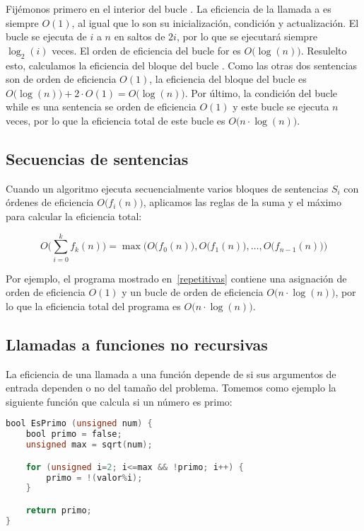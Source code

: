 Fijémonos primero en el interior del bucle .
La eficiencia de la llamada a  es siempre $O(1)$, al igual que lo son su inicialización, condición y actualización.
El bucle se ejecuta de $i$ a $n$ en saltos de $2i$, por lo que se ejecutará siempre $\log_2(i)$ veces.
El orden de eficiencia del bucle for es $O\big(\log(n)\big)$.
Resulelto esto, calculamos la eficiencia del bloque del bucle .
Como las otras dos sentencias son de orden de eficiencia $O(1)$, la eficiencia del bloque del bucle  es $O\big(\log(n)\big)+2\cdot O(1)=O\big(\log(n)\big)$.
Por último, la condición del bucle while es una sentencia se orden de eficiencia $O(1)$ y este bucle se ejecuta $n$ veces, por lo que la eficiencia total de este bucle es $O\big(n\cdot\log(n)\big)$.

\pagebreak

\subsection{Secuencias de sentencias}\label{secuenciasentencias}

Cuando un algoritmo ejecuta secuencialmente varios bloques de sentencias $S_i$ con órdenes de eficiencia $O\big(f_i(n)\big)$, aplicamos las reglas de la suma y el máximo para calcular la eficiencia total:

\[O\Big(\sum_{i=0}^{k}f_k(n)\Big) = \max\Big(O\big(f_0(n)\big),O\big(f_1(n)\big),\ldots,O\big(f_{n-1}(n)\big)\Big)\]

Por ejemplo, el programa mostrado en~\ref{repetitivas} contiene una asignación de orden de eficiencia $O(1)$ y un bucle de orden de eficiencia $O\big(n\cdot\log(n)\big)$, por lo que la eficiencia total del programa es $O\big(n\cdot\log(n)\big)$.

\subsection{Llamadas a funciones no recursivas}

La eficiencia de una llamada a una función depende de si sus argumentos de entrada dependen o no del tamaño del problema.
Tomemos como ejemplo la siguiente función que calcula si un número es primo:

\begin{lstlisting}[language=C]
bool EsPrimo (unsigned num) {
	bool primo = false;
	unsigned max = sqrt(num);

	for (unsigned i=2; i<=max && !primo; i++) {
		primo = !(valor%i);
	}

	return primo;
}
\end{lstlisting}

